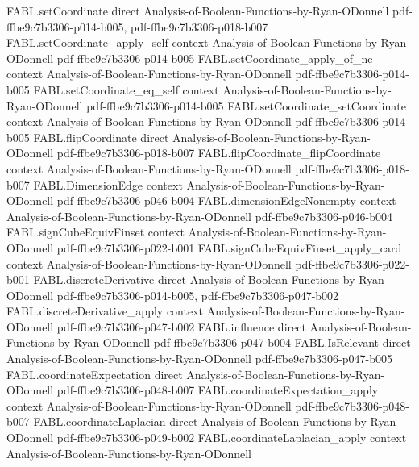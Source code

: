 \begin{theorem}
\proofstep
  {FABL.setCoordinate}
  {direct}
  {Analysis-of-Boolean-Functions-by-Ryan-ODonnell}
  {pdf-ffbe9c7b3306-p014-b005,
    pdf-ffbe9c7b3306-p018-b007}
\proofstep
  {FABL.setCoordinate_apply_self}
  {context}
  {Analysis-of-Boolean-Functions-by-Ryan-ODonnell}
  {pdf-ffbe9c7b3306-p014-b005}
\proofstep
  {FABL.setCoordinate_apply_of_ne}
  {context}
  {Analysis-of-Boolean-Functions-by-Ryan-ODonnell}
  {pdf-ffbe9c7b3306-p014-b005}
\proofstep
  {FABL.setCoordinate_eq_self}
  {context}
  {Analysis-of-Boolean-Functions-by-Ryan-ODonnell}
  {pdf-ffbe9c7b3306-p014-b005}
\proofstep
  {FABL.setCoordinate_setCoordinate}
  {context}
  {Analysis-of-Boolean-Functions-by-Ryan-ODonnell}
  {pdf-ffbe9c7b3306-p014-b005}
\proofstep
  {FABL.flipCoordinate}
  {direct}
  {Analysis-of-Boolean-Functions-by-Ryan-ODonnell}
  {pdf-ffbe9c7b3306-p018-b007}
\proofstep
  {FABL.flipCoordinate_flipCoordinate}
  {context}
  {Analysis-of-Boolean-Functions-by-Ryan-ODonnell}
  {pdf-ffbe9c7b3306-p018-b007}
\proofstep
  {FABL.DimensionEdge}
  {context}
  {Analysis-of-Boolean-Functions-by-Ryan-ODonnell}
  {pdf-ffbe9c7b3306-p046-b004}
\proofstep
  {FABL.dimensionEdgeNonempty}
  {context}
  {Analysis-of-Boolean-Functions-by-Ryan-ODonnell}
  {pdf-ffbe9c7b3306-p046-b004}
\proofstep
  {FABL.signCubeEquivFinset}
  {context}
  {Analysis-of-Boolean-Functions-by-Ryan-ODonnell}
  {pdf-ffbe9c7b3306-p022-b001}
\proofstep
  {FABL.signCubeEquivFinset_apply_card}
  {context}
  {Analysis-of-Boolean-Functions-by-Ryan-ODonnell}
  {pdf-ffbe9c7b3306-p022-b001}
\proofstep
  {FABL.discreteDerivative}
  {direct}
  {Analysis-of-Boolean-Functions-by-Ryan-ODonnell}
  {pdf-ffbe9c7b3306-p014-b005,
    pdf-ffbe9c7b3306-p047-b002}
\proofstep
  {FABL.discreteDerivative_apply}
  {context}
  {Analysis-of-Boolean-Functions-by-Ryan-ODonnell}
  {pdf-ffbe9c7b3306-p047-b002}
\proofstep
  {FABL.influence}
  {direct}
  {Analysis-of-Boolean-Functions-by-Ryan-ODonnell}
  {pdf-ffbe9c7b3306-p047-b004}
\proofstep
  {FABL.IsRelevant}
  {direct}
  {Analysis-of-Boolean-Functions-by-Ryan-ODonnell}
  {pdf-ffbe9c7b3306-p047-b005}
\proofstep
  {FABL.coordinateExpectation}
  {direct}
  {Analysis-of-Boolean-Functions-by-Ryan-ODonnell}
  {pdf-ffbe9c7b3306-p048-b007}
\proofstep
  {FABL.coordinateExpectation_apply}
  {context}
  {Analysis-of-Boolean-Functions-by-Ryan-ODonnell}
  {pdf-ffbe9c7b3306-p048-b007}
\proofstep
  {FABL.coordinateLaplacian}
  {direct}
  {Analysis-of-Boolean-Functions-by-Ryan-ODonnell}
  {pdf-ffbe9c7b3306-p049-b002}
\proofstep
  {FABL.coordinateLaplacian_apply}
  {context}
  {Analysis-of-Boolean-Functions-by-Ryan-ODonnell}

\end{theorem}
